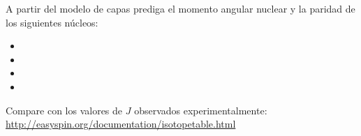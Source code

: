 \documentclass[./../main.tex]{subfiles}
\begin{document}
	\begin{exercise}
		A partir del modelo de capas prediga el momento angular nuclear y la paridad de los siguientes núcleos:

		\begin{itemize}
			\item {}
			\item {}
			\item {}
			\item {}
		\end{itemize}

		Compare con los valores de \(J\) observados experimentalmente: \url{http://easyspin.org/documentation/isotopetable.html}
	\end{exercise}
\end{document}
